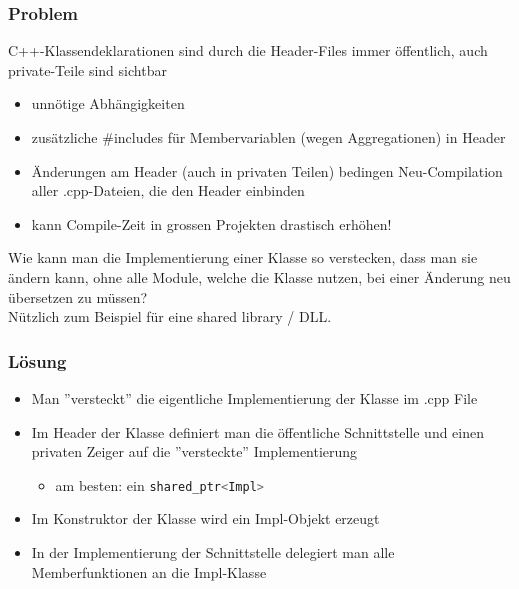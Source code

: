 \subsubsection{Problem}
C++-Klassendeklarationen sind durch die Header-Files immer öffentlich, auch private-Teile sind sichtbar
\begin{itemize}
  \item unnötige Abhängigkeiten
  \item zusätzliche \#includes für Membervariablen (wegen Aggregationen) in Header
  \item Änderungen am Header (auch in privaten Teilen) bedingen Neu-Compilation aller .cpp-Dateien, die den Header einbinden
  \item kann Compile-Zeit in grossen Projekten drastisch erhöhen!
\end{itemize}
Wie kann man die Implementierung einer Klasse so verstecken, dass man sie ändern kann, ohne alle Module, welche die Klasse nutzen, bei einer Änderung neu übersetzen zu müssen?\\
Nützlich zum Beispiel für eine shared library / DLL.

\subsubsection{Lösung}
\begin{itemize}
\item  Man ''versteckt'' die eigentliche Implementierung der Klasse im .cpp File
\item  Im Header der Klasse definiert man die öffentliche Schnittstelle und einen privaten Zeiger auf die ''versteckte'' Implementierung
\begin{itemize}
  \item am besten: ein \lstinline[language=C++]{shared_ptr<Impl>}
\end{itemize}
\item Im Konstruktor der Klasse wird ein Impl-Objekt erzeugt
\item In der Implementierung der Schnittstelle delegiert man alle Memberfunktionen an die Impl-Klasse
\end{itemize}

\pagebreak %

